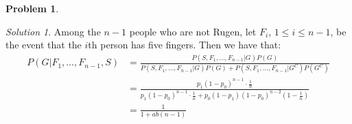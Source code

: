\documentclass[11pt]{article}
\theoremstyle{definition}
\newtheorem{prob}[theo]{\color{Maroon} Problem}
\theoremstyle{remark}
\newtheorem*{soln}{\color{Maroon} Solution}
\begin{document}
\begin{prob}
\begin{enumerate}[label = (\alph*)]
    \begin{soln}
    Among the $n-1$ people who are not Rugen, let $F_i$, $1 \le i \le n-1$, be the event that the $i$th person has five fingers. Then we have that:
    \begin{align*}
        P(G | F_1, \dots, F_{n-1}, S) &= \frac{P(S, F_1, \dots, F_{n-1}|G)P(G)}{P(S, F_1, \dots, F_{n-1}|G)P(G) + P(S, F_1, \dots, F_{n-1}|G^C)P(G^C)} \\
        &= \frac{p_1(1 - p_0)^{n-1}\cdot \frac{1}{n}}{p_1(1 - p_0)^{n-1}\cdot \frac{1}{n} + p_0(1-p_1)(1-p_0)^{n-2}(1 - \frac{1}{n})} \\
        &= \frac{1}{1 + ab(n-1)}
    \end{align*}
    \end{soln}
\end{enumerate} 

\end{prob}

\pagebreak
\end{document}
